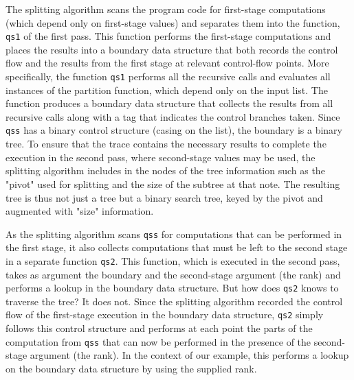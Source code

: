 \begin{abstrsyn}
The splitting algorithm scans the program code for first-stage
computations (which depend only on first-stage values) and separates
them into the function, \texttt{qs1} of the first pass. This function
performs the first-stage computations and places the results into a
boundary data structure that both records the control flow and the
results from the first stage at relevant control-flow points.  More
specifically, the function \texttt{qs1} performs all the recursive
calls and evaluates all instances of the partition function, which
depend only on the input list.  The function produces a boundary data
structure that collects the results from all recursive calls along
with a tag that indicates the control branches taken.  Since
\texttt{qss} has a binary control structure (casing on the list), the
boundary is a binary tree.  To ensure that the trace contains the
necessary results to complete the execution in the second pass, where
second-stage values may be used, the splitting algorithm includes in
the nodes of the tree information such as the "pivot" used for
splitting and the size of the subtree at that note.  The resulting
tree is thus not just a tree but a binary search tree, keyed by the
pivot and augmented with "size" information.

As the splitting algorithm scans \texttt{qss} for computations that
can be performed in the first stage, it also collects computations
that must be left to the second stage in a separate function
\texttt{qs2}.  This function, which is executed in the second pass,
takes as argument the boundary and the second-stage argument (the
rank) and performs a lookup in the boundary data structure.  But how
does \texttt{qs2} knows to traverse the tree? It does not. Since
the splitting algorithm recorded the control flow of the first-stage
execution in the boundary data structure, \texttt{qs2} simply follows
this control structure and performs at each point the parts of the
computation from \texttt{qss} that can now be performed in the
presence of the second-stage argument (the rank).  In the context of
our example, this performs a lookup on the boundary data structure by
using the supplied rank.


\end{abstrsyn}
